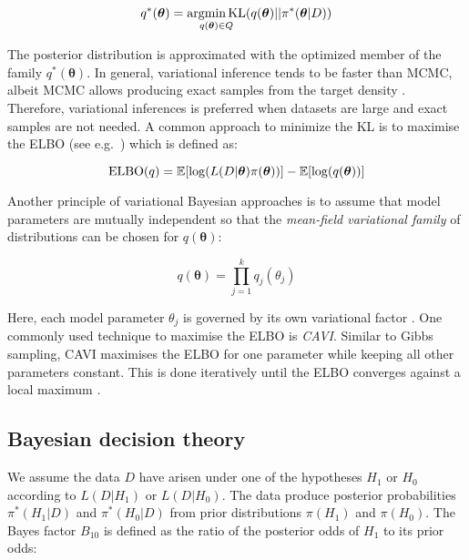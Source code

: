 \begin{equation}
q^\ast(\bm{\theta})=\underset{q(\bm{\theta})\in{}Q}{\textnormal{argmin\,{}KL}}(q(\bm{\theta})||\pi^*(\bm{\theta}|D))
\end{equation}

The posterior distribution is approximated with the optimized member of the family $q^\ast(\bm{\theta})$\citep{Blei2017}. In general, variational inference tends to be faster than MCMC, albeit MCMC allows producing exact samples from the target density \citep{Blei2017}. Therefore, variational inferences is preferred when datasets are large and exact samples are not needed. A common approach to minimize the KL is to maximise the \gls{ELBO} (see e.g.~\citep{Beal2003}) which is defined as:

\begin{equation}
\textnormal{ELBO}(q)=\mathbb{E}[\log(L(D|\bm{\theta})\pi(\bm{\theta}))] - \mathbb{E}[\log(q(\bm{\theta}))]
\end{equation}

Another principle of variational Bayesian approaches is to assume that model parameters are mutually independent so that the \emph{mean-field variational family} of distributions can be chosen for $q(\bm{\theta})$:

\begin{equation}
q(\bm{\theta})=\prod_{j=1}^k{}q_j(\theta_j)
\end{equation}

Here, each model parameter $\theta_j$ is governed by its own variational factor \citep{Blei2017}. One commonly used technique to maximise the ELBO is \emph{\gls{CAVI}}. Similar to Gibbs sampling, CAVI maximises the ELBO for one parameter while keeping all other parameters constant. This is done iteratively until the ELBO converges against a local maximum \citep{Blei2017}. 

\subsection{Bayesian decision theory} \label{sec0:decision}

We assume the data $D$ have arisen under one of the hypotheses $H_1$ or $H_0$ according to $L(D|H_1)$ or $L(D|H_0)$. The data produce posterior probabilities $\pi^*(H_1|D)$ and $\pi^*(H_0|D)$ from prior distributions $\pi(H_1)$ and $\pi(H_0)$. The Bayes factor $B_{10}$ \citep{Jeffreys1961} is defined as the ratio of the posterior odds of $H_1$ to its prior odds:

